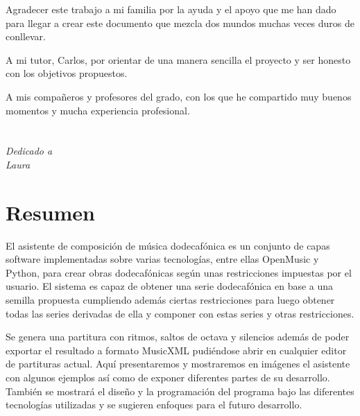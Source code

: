 \documentclass[a4paper,openright,12pt]{book}
\begin{document}
Agradecer este trabajo a mi familia por la ayuda y el apoyo que me han dado para llegar a crear este documento que mezcla dos mundos muchas veces duros de conllevar.

A mi tutor, Carlos, por orientar de una manera sencilla el proyecto y ser honesto con los objetivos propuestos.

A mis compañeros y profesores del grado, con los que he compartido muy buenos momentos y mucha experiencia profesional.


\chapter*{}
\begin{flushright}
\textit{Dedicado a \\
Laura}
\end{flushright}


\chapter*{Resumen} %

El asistente de composición de música dodecafónica es un conjunto de capas software implementadas sobre varias tecnologías, entre ellas OpenMusic y Python, para crear obras dodecafónicas según unas restricciones impuestas por el usuario. El sistema es capaz de obtener una serie dodecafónica en base a una semilla propuesta cumpliendo además ciertas restricciones para luego obtener todas las series derivadas de ella y componer con estas series y otras restricciones.

Se genera una partitura con ritmos, saltos de octava y silencios además de poder exportar el resultado a formato MusicXML pudiéndose abrir en cualquier editor de partituras actual. Aquí presentaremos y mostraremos en imágenes el asistente con algunos ejemplos así como de exponer diferentes partes de su desarrollo. También se mostrará el diseño y la programación del programa bajo las diferentes tecnologías utilizadas y se sugieren enfoques para el futuro desarrollo.





\tableofcontents %

\cleardoublepage
{} %
\listoffigures %
\end{document}
